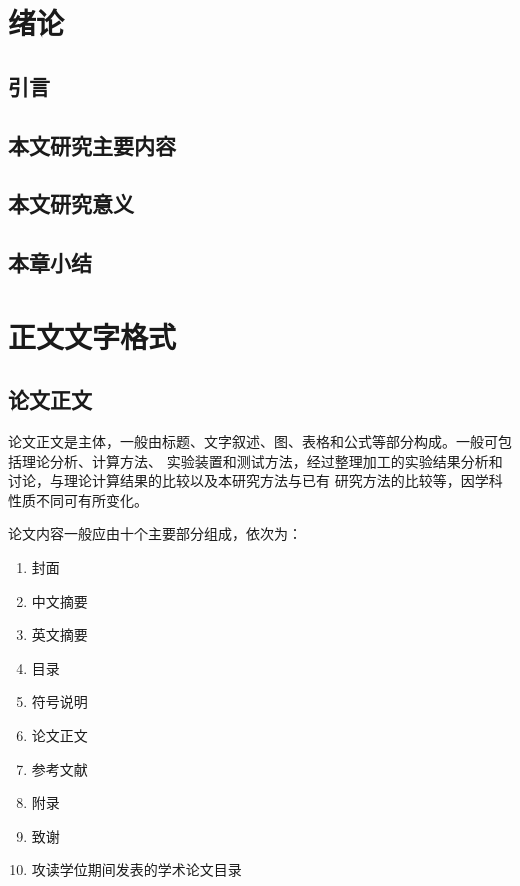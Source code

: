 \chapter{绪论}

\section{引言}

\zhlipsum[1]

\section{本文研究主要内容}

\zhlipsum[2]

\section{本文研究意义}

\zhlipsum[3]

\section{本章小结}

\zhlipsum[4]


\chapter{正文文字格式}

\section{论文正文}

论文正文是主体，一般由标题、文字叙述、图、表格和公式等部分构成。一般可包括理论分析、计算方法、
实验装置和测试方法，经过整理加工的实验结果分析和讨论，与理论计算结果的比较以及本研究方法与已有
研究方法的比较等，因学科性质不同可有所变化。\cite{Jia2000}

论文内容一般应由十个主要部分组成，依次为：
\begin{enumerate}
  \item 封面
  \item 中文摘要
  \item 英文摘要
  \item 目录
  \item 符号说明
  \item 论文正文
  \item 参考文献
  \item 附录
  \item 致谢
  \item 攻读学位期间发表的学术论文目录
\end{enumerate}

